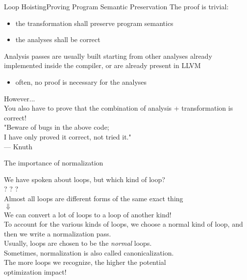 \begin{frame}{Loop Hoisting}{Proving Program Semantic Preservation}
The \alert{proof} is trivial:

\begin{itemize}
\item the transformation shall preserve program semantics
\item the analyses shall be correct
\end{itemize}

Analysis passes are usually built starting from other analyses already
implemented inside the compiler, or are already present in LLVM
\begin{itemize}
\item often, no proof is necessary for the analyses
\end{itemize}

\vfill
\begin{center}
\alert{However...}\\
\smallskip
You also have to prove that the combination of analysis + transformation is correct!\\
\smallskip
"Beware of bugs in the above code;\\I have only proved it correct, not tried it."\\--- Knuth
\end{center}
\end{frame}


\begin{frame}{The importance of normalization}
\begin{center}
We have spoken about loops, but which kind of loop?\\
\medskip
{}? ? ?\\

\bigskip
Almost all loops are different forms of the \alert{same exact thing}\\
$\Downarrow$\\
We can convert a lot of loops to a loop of another kind!\\

\bigskip
To account for the various kinds of loops, we choose a \alert{normal}
kind of loop, and then we write a \alert{normalization} pass.\\
\smallskip
{\footnotesize
Usually,  loops are chosen to be the \emph{normal} loops.\\
\vspace{-1mm}
Sometimes, normalization is also called \alert{canonicalization}.}\\

\bigskip
The more loops we recognize, the higher the potential\\
\alert{optimization impact}!
\end{center}
\end{frame}


